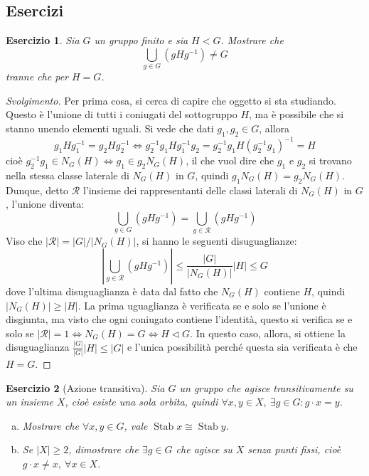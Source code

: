 \documentclass[12pt]{scrartcl}
\theoremstyle{style}
\newtheorem{esercizio}{Esercizio}[section]
\newenvironment{svolgimento}{\renewcommand\qedsymbol{$\blacksquare$}\begin{proof}[Svolgimento]}{\end{proof}}
\numberwithin{equation}{subsection}
\begin{document}
\subsection{Esercizi}
\begin{esercizio}\label{exdl2}
	Sia $G$ un gruppo finito e sia $H < G$. 
	Mostrare che 
	\[
	\bigcup_{g \in G} \left(g H g^{-1}\right) \neq G
	\] 
	tranne che per $H = G$.
\end{esercizio}
\begin{svolgimento}
	Per prima cosa, si cerca di capire che oggetto si sta studiando.
	Questo \`e l'unione di tutti i coniugati del sottogruppo $H$, ma \`e possibile che si stanno unendo elementi uguali. 
	Si vede che dati $g_1,g_2 \in G$, allora 
	\[
	g_1H g_1^{-1} = g_2Hg_2^{-1}\iff g_2^{-1}g_1H g_1^{-1} g_2 =g_2^{-1}g_1H(g_2^{-1}g_1)^{-1}=H 
	\] 
	cio\`e $g_2^{-1}g_1 \in N_G(H) \iff g_1 \in g_2N_G(H)$, il che vuol dire che $g_1$ e $g_2$ si trovano nella stessa classe laterale di $N_G(H)$ in $G$, quindi $g_1 N_G(H) = g_2N_G(H)$.
Dunque, detto $\mathcal{R} $ l'insieme dei rappresentanti delle classi laterali di $N_G(H)$ in $G$, l'unione diventa:
\[
	\bigcup_{g \in G} \left(g H g^{-1}\right)= \bigcup_{g \in \mathcal{R} } (gHg^{-1})
\] 
Viso che $\lvert \mathcal{R}  \rvert  = \lvert G \rvert / \lvert N_G(H) \rvert $, si hanno le seguenti disuguaglianze:
\[
\left\lvert \bigcup_{g \in  \mathcal{R} } (gHg^{-1}) \right\rvert \le \frac{\lvert G \rvert }{\lvert N_G(H) \rvert } \lvert H \rvert \le G
\] 
dove l'ultima disuguaglianza \`e data dal fatto che $N_G(H)$ contiene $H$, quindi $\lvert N_G(H)\rvert \ge \lvert H \rvert   $.
La prima uguaglianza \`e verificata se e solo se l'unione \`e disgiunta, ma visto che ogni coniugato contiene l'identit\`a, questo si verifica se e solo se $|\mathcal{R} |= 1\iff N_G(H) = G \iff H \lhd G$.
In questo caso, allora, si ottiene la disuguaglianza $\frac{\lvert G \rvert }{\lvert G \rvert } \lvert H \rvert \le \lvert G \rvert $ e l'unica possibilit\`a perch\'e questa sia verificata \`e che $H = G$.
\end{svolgimento}
\begin{esercizio}
	[Azione transitiva]
	Sia $G$ un gruppo che agisce transitivamente su un insieme $X$, cio\`e esiste una sola orbita, quindi $\forall x,y\in X, \ \exists g \in G : g \cdot x = y$.
	\begin{enumerate}[(a).]
		\item Mostrare che $\forall x,y \in G$, vale $\operatorname{Stab} x \cong \operatorname{Stab} y$.
		\item Se $\lvert X \rvert \ge 2$, dimostrare che $\exists g \in G$ che agisce su $X$ senza punti fissi, cio\`e $g \cdot x \neq x, \ \forall x \in X$.
	\end{enumerate}
\end{esercizio}
\end{document}
